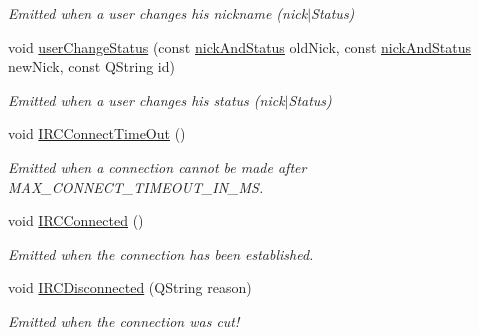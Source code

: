 \begin{DoxyCompactItemize}
\begin{DoxyCompactList}\small\item\em Emitted when a user changes his nickname (nick$|$\-Status) \end{DoxyCompactList}\item 
void \hyperlink{classserver_1_1irc_client_afa10a5c7c8ee0a4cfdae135d6737a0a2}{user\-Change\-Status} (const \hyperlink{structserver_1_1nick_and_status}{nick\-And\-Status} old\-Nick, const \hyperlink{structserver_1_1nick_and_status}{nick\-And\-Status} new\-Nick, const Q\-String id)
\begin{DoxyCompactList}\small\item\em Emitted when a user changes his status (nick$|$\-Status) \end{DoxyCompactList}\item 
void \hyperlink{classserver_1_1irc_client_a6e73d106182456e97f48db009a29642d}{I\-R\-C\-Connect\-Time\-Out} ()
\begin{DoxyCompactList}\small\item\em Emitted when a connection cannot be made after M\-A\-X\-\_\-\-C\-O\-N\-N\-E\-C\-T\-\_\-\-T\-I\-M\-E\-O\-U\-T\-\_\-\-I\-N\-\_\-\-M\-S. \end{DoxyCompactList}\item 
void \hyperlink{classserver_1_1irc_client_a47c67bb9fd8640adf17a6ae01f8b7154}{I\-R\-C\-Connected} ()
\begin{DoxyCompactList}\small\item\em Emitted when the connection has been established. \end{DoxyCompactList}\item 
void \hyperlink{classserver_1_1irc_client_acb710c977bd5411f99dc8fdaf92e91a4}{I\-R\-C\-Disconnected} (Q\-String reason)
\begin{DoxyCompactList}\small\item\em Emitted when the connection was cut! \end{DoxyCompactList}\end{DoxyCompactItemize}
